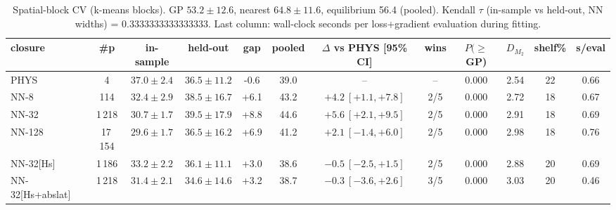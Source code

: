 \begin{table}[t]\centering\footnotesize
\caption{Spatial-block CV (k-means blocks). GP $53.2\pm12.6$, nearest $64.8\pm11.6$, equilibrium 56.4 (pooled). Kendall $\tau$ (in-sample vs held-out, NN widths) = 0.3333333333333333. Last column: wall-clock seconds per loss+gradient evaluation during fitting.}
\label{tab:block}
\begin{tabular}{lccccccccccc}
\toprule
closure & \#p & in-sample & held-out & gap & pooled & $\Delta$ vs PHYS [95\% CI] & wins & $P(\ge$GP) & $D_{M_2}$ & shelf\% & s/eval \\
\midrule
\textsc{PHYS} & 4 & $37.0\pm2.4$ & $36.5\pm11.2$ & -0.6 & 39.0 & -- & -- & 0.000 & 2.54 & 22 & 0.66 \\
\textsc{NN-8} & 114 & $32.4\pm2.9$ & $38.5\pm16.7$ & +6.1 & 43.2 & $+4.2\ [+1.1,+7.8]$ & 2/5 & 0.000 & 2.72 & 18 & 0.67 \\
\textsc{NN-32} & 1\,218 & $30.7\pm1.7$ & $39.5\pm17.9$ & +8.8 & 44.6 & $+5.6\ [+2.1,+9.5]$ & 2/5 & 0.000 & 2.91 & 18 & 0.69 \\
\textsc{NN-128} & 17\,154 & $29.6\pm1.7$ & $36.5\pm16.2$ & +6.9 & 41.2 & $+2.1\ [-1.4,+6.0]$ & 2/5 & 0.000 & 2.98 & 18 & 0.76 \\
\textsc{NN-32}[Hs] & 1\,186 & $33.2\pm2.2$ & $36.1\pm11.1$ & +3.0 & 38.6 & $-0.5\ [-2.5,+1.5]$ & 2/5 & 0.000 & 2.88 & 20 & 0.69 \\
\textsc{NN-32}[Hs+abslat] & 1\,218 & $31.4\pm2.1$ & $34.6\pm14.6$ & +3.2 & 38.7 & $-0.3\ [-3.6,+2.6]$ & 3/5 & 0.000 & 3.03 & 20 & 0.46 \\
\bottomrule
\end{tabular}
\end{table}
